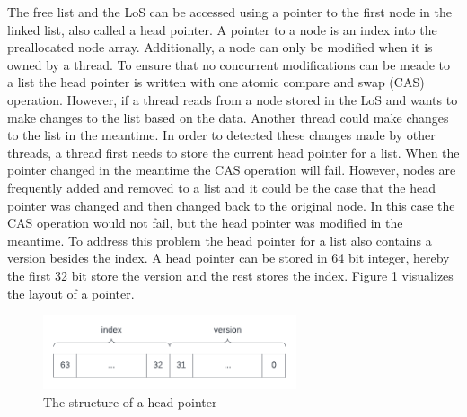 \documentclass[sigconf,nonacm]{acmart}
\begin{document}
        The free list and the LoS can be accessed using a pointer to the first node in the linked list, also called a head pointer. A pointer to a node is an index into the preallocated node array. Additionally, a node can only be modified when it is owned by a thread. To ensure that no concurrent modifications can be meade to a list the head pointer is written with one atomic compare and swap (CAS) operation. 
        However, if a thread reads from a node stored in the LoS and wants to make changes to the list based on the data. Another thread could make changes to the list in the meantime. In order to detected these changes made by other threads, a thread first needs to store the current head pointer for a list. When the pointer changed in the meantime the CAS operation will fail. However, nodes are frequently added and removed to a list and it could be the case that the head pointer was changed and then changed back to the original node. In this case the CAS operation would not fail, but the head pointer was modified in the meantime. To address this problem the head pointer for a list also contains a version besides the index. A head pointer can be stored in 64 bit integer, hereby the first 32 bit store the version and the rest stores the index. Figure \ref{fig:pointer} visualizes the layout of a pointer.
        \begin{figure}[h]
            \includegraphics[height=2.2cm]{figure4.pdf}
            \caption{The structure of a head pointer}
            \label{fig:pointer}
        \end{figure}  
\end{document}
